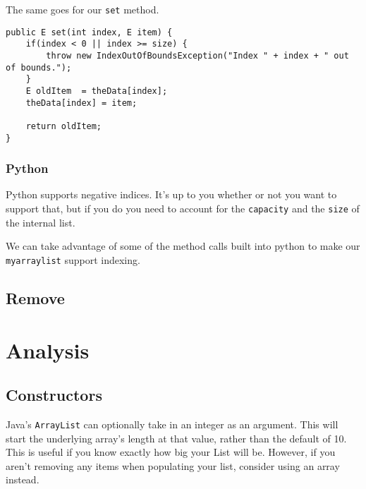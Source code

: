The same goes for our \texttt{set} method. 
\begin{verbatim}
public E set(int index, E item) {
	if(index < 0 || index >= size) {
		throw new IndexOutOfBoundsException("Index " + index + " out of bounds.");
	}
	E oldItem  = theData[index];
	theData[index] = item;
	
	return oldItem;
}
\end{verbatim}

\subsubsection{Python}

Python supports negative indices.  It's up to you whether or not you want to support that, but if you do you need to account for the \texttt{capacity} and the \texttt{size} of the internal list.


We can take advantage of some of the method calls built into python to make our \texttt{myarraylist} support indexing.


\subsection{Remove}



\section{Analysis}





\subsection{Constructors}
Java's \texttt{ArrayList} can optionally take in an integer as an argument.
This will start the underlying array's length at that value, rather than the default of 10.
This is useful if you know exactly how big your List will be.  
However, if you aren't removing any items when populating your list, consider using an array instead.

